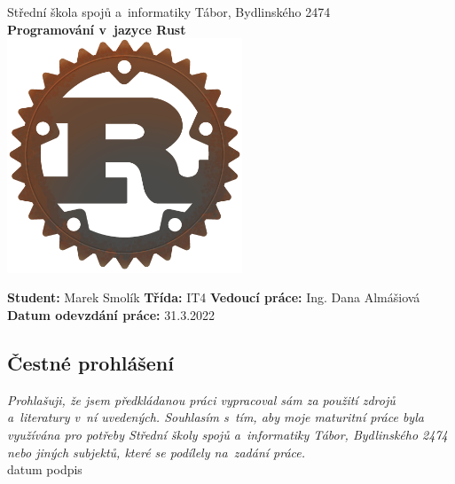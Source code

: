 \documentclass[a4paper, 12pt, twoside]{article} %
\begin{document}
\thispagestyle{empty}
\begin{center}
	{\LARGE Střední škola spojů a~informatiky Tábor, Bydlinského 2474} \\[1.5cm]
	\textbf{\LARGE Programování v~jazyce Rust} \\ [4cm]
	\includegraphics[width=7cm]{logo_alt.png}
\end{center}

\vspace*{\fill}

\begin{flushleft}
	\large
	\textbf{Student: }Marek Smolík              \newline
	\textbf{Třída: }IT4                         \newline
	\textbf{Vedoucí práce: }Ing. Dana Almášiová \newline
	\textbf{Datum odevzdání práce: } 31.3.2022
\end{flushleft}
\vfill

\newpage
\thispagestyle{empty}
\vspace*{\fill}


\subsection*{Čestné prohlášení}
	\noindent \textit{Prohlašuji, že jsem předkládanou práci vypracoval sám za použití zdrojů a~literatury v~ní uvedených. Souhlasím s~tím, aby moje maturitní práce byla využívána pro potřeby Střední školy spojů a~informatiky Tábor, Bydlinského 2474 nebo jiných subjektů, které se podílely na~zadání práce.} \\[1.5cm]
	\noindent \makebox[3cm]{\dotfill} \hfill \makebox[3cm]{\dotfill} \newline
	\noindent datum \hfill podpis

\newpage
\end{document}
